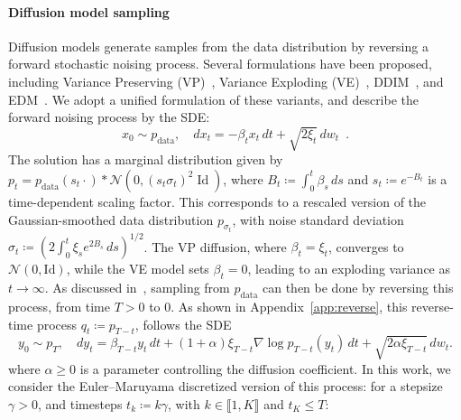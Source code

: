 \documentclass[11pt]{article}
\newcommand{\eqdef}{\coloneqq}
\newcommand{\id}{\operatorname{Id}}
\begin{document}
\paragraph{Diffusion model sampling}
Diffusion models generate samples from the data distribution by reversing a forward stochastic noising process. Several formulations have been proposed, including Variance Preserving (VP)~\cite{song2020score, ho2020denoising}, Variance Exploding (VE)~\cite{song2020score}, DDIM~\cite{song2020denoising}, and EDM~\cite{karras2022elucidating}.
We adopt a unified formulation of these variants, and describe the forward noising process by the SDE:
\begin{equation} \label{eq:forward_SDE}
    x_0 \sim p_{\mathrm{data}}, \quad dx_t = -\beta_t x_t\, dt + \sqrt{2 \xi_t}\, dw_t\enspace.
\end{equation}
The solution has a marginal distribution given by \( p_t = p_{\mathrm{data}}(s_t \cdot) * \mathcal{N}\left(0, (s_t \sigma_t)^2 \id\right) \), where \( B_t \coloneqq \int_0^t \beta_s \, ds \) and \( s_t \coloneqq e^{-B_t} \) is a time-dependent scaling factor. This corresponds to a rescaled version of the Gaussian-smoothed data distribution \( p_{\sigma_t} \), with noise standard deviation \( \sigma_t \coloneqq \left(2 \int_0^t \xi_s e^{2B_s} \, ds \right)^{1/2} \).
The VP diffusion, where \( \beta_t = \xi_t \), converges to \( \mathcal{N}(0, \mathrm{Id}) \), while the VE model sets \( \beta_t = 0 \), leading to an exploding variance as \( t \to \infty \). As discussed in~\cite{song2020score}, sampling from $p_{\mathrm{data}}$ can then be done by reversing this process, from time $T>0$ to $0$. As shown in Appendix~\ref{app:reverse}, this reverse-time process  \( q_t \eqdef p_{T-t} \), follows the SDE
\begin{equation} \label{eq:backward_SDE}
    y_0 \sim p_T, \quad dy_t = \beta_{T-t} y_t\, dt + (1 + \alpha) \xi_{T-t} \nabla \log p_{T-t}(y_t)\, dt + \sqrt{2 \alpha \xi_{T-t}}\, dw_t.
\end{equation}
where \( \alpha \geq 0 \) is a parameter controlling the diffusion coefficient. In this work, we consider the Euler–Maruyama discretized version of this process: for a stepsize $\gamma > 0$, and timesteps $t_k \eqdef k\gamma$, with $k \in \llbracket 1, K \rrbracket$ and $t_K \leq T$:
\end{document}
